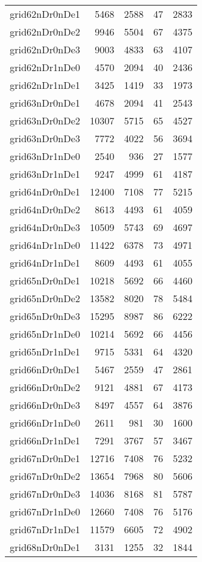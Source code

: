 \begin{longtable}{lrrrr}
grid62nDr0nDe1 & 5468 & 2588 & 47 & 2833 \\
grid62nDr0nDe2 & 9946 & 5504 & 67 & 4375 \\
grid62nDr0nDe3 & 9003 & 4833 & 63 & 4107 \\
grid62nDr1nDe0 & 4570 & 2094 & 40 & 2436 \\
grid62nDr1nDe1 & 3425 & 1419 & 33 & 1973 \\
grid63nDr0nDe1 & 4678 & 2094 & 41 & 2543 \\
grid63nDr0nDe2 & 10307 & 5715 & 65 & 4527 \\
grid63nDr0nDe3 & 7772 & 4022 & 56 & 3694 \\
grid63nDr1nDe0 & 2540 & 936 & 27 & 1577 \\
grid63nDr1nDe1 & 9247 & 4999 & 61 & 4187 \\
grid64nDr0nDe1 & 12400 & 7108 & 77 & 5215 \\
grid64nDr0nDe2 & 8613 & 4493 & 61 & 4059 \\
grid64nDr0nDe3 & 10509 & 5743 & 69 & 4697 \\
grid64nDr1nDe0 & 11422 & 6378 & 73 & 4971 \\
grid64nDr1nDe1 & 8609 & 4493 & 61 & 4055 \\
grid65nDr0nDe1 & 10218 & 5692 & 66 & 4460 \\
grid65nDr0nDe2 & 13582 & 8020 & 78 & 5484 \\
grid65nDr0nDe3 & 15295 & 8987 & 86 & 6222 \\
grid65nDr1nDe0 & 10214 & 5692 & 66 & 4456 \\
grid65nDr1nDe1 & 9715 & 5331 & 64 & 4320 \\
grid66nDr0nDe1 & 5467 & 2559 & 47 & 2861 \\
grid66nDr0nDe2 & 9121 & 4881 & 67 & 4173 \\
grid66nDr0nDe3 & 8497 & 4557 & 64 & 3876 \\
grid66nDr1nDe0 & 2611 & 981 & 30 & 1600 \\
grid66nDr1nDe1 & 7291 & 3767 & 57 & 3467 \\
grid67nDr0nDe1 & 12716 & 7408 & 76 & 5232 \\
grid67nDr0nDe2 & 13654 & 7968 & 80 & 5606 \\
grid67nDr0nDe3 & 14036 & 8168 & 81 & 5787 \\
grid67nDr1nDe0 & 12660 & 7408 & 76 & 5176 \\
grid67nDr1nDe1 & 11579 & 6605 & 72 & 4902 \\
grid68nDr0nDe1 & 3131 & 1255 & 32 & 1844 \\

\end{longtable}
